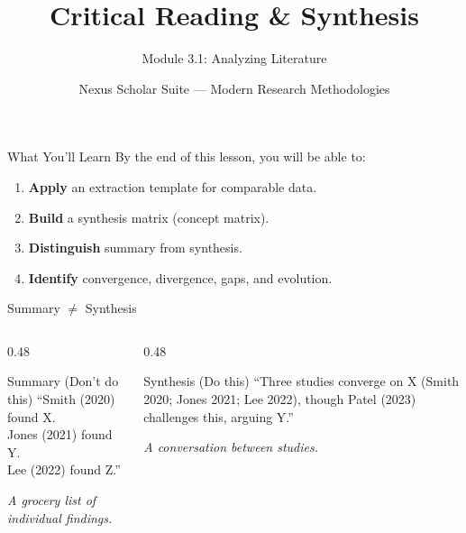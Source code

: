 \documentclass[aspectratio=169]{beamer}
\title{Critical Reading \& Synthesis}
\subtitle{Module 3.1: Analyzing Literature}
\author{Nexus Scholar Suite --- Modern Research Methodologies}
\date{}
\begin{document}
\begin{frame}[plain]
  \titlepage
\end{frame}

\begin{frame}{What You'll Learn}
  By the end of this lesson, you will be able to:
  \begin{enumerate}
    \item \textbf{Apply} an extraction template for comparable data.
    \item \textbf{Build} a synthesis matrix (concept matrix).
    \item \textbf{Distinguish} summary from synthesis.
    \item \textbf{Identify} convergence, divergence, gaps, and evolution.
  \end{enumerate}
\end{frame}

\begin{frame}{Summary $\neq$ Synthesis}
  \begin{columns}[T]
    \begin{column}{0.48\textwidth}
      \begin{alertblock}{Summary (Don't do this)}
        ``Smith (2020) found X.\\
        Jones (2021) found Y.\\
        Lee (2022) found Z.''
        \vspace{0.2cm}
        
        \textit{A grocery list of individual findings.}
      \end{alertblock}
    \end{column}
    \begin{column}{0.48\textwidth}
      \begin{exampleblock}{Synthesis (Do this)}
        ``Three studies converge on X (Smith 2020; Jones 2021; Lee 2022), though Patel (2023) challenges this, arguing Y.''
        \vspace{0.2cm}
        
        \textit{A conversation between studies.}
      \end{exampleblock}
    \end{column}
  \end{columns}
\end{frame}
\end{document}
